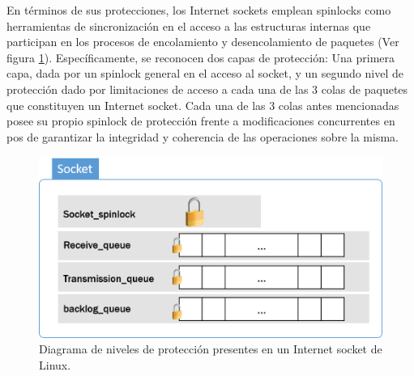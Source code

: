 En términos de sus protecciones, los Internet sockets emplean spinlocks como herramientas de sincronización en el acceso a las estructuras internas que participan en los procesos de encolamiento y desencolamiento de paquetes (Ver figura \ref{fig:socketAnathomy2}). Específicamente, se reconocen dos capas de protección: Una primera capa, dada por un spinlock general en el acceso al socket, y un segundo nivel de protección dado por limitaciones de acceso a cada una de las 3 colas de paquetes que constituyen un Internet socket. Cada una de las 3 colas antes mencionadas posee su propio spinlock de protección frente a modificaciones concurrentes en pos de garantizar la integridad y coherencia de las operaciones sobre la misma.

\begin{figure}[!h]
	\centering
	\includegraphics[scale=0.6]{imagenes/spinlocksSocket.png}
	\caption{Diagrama de niveles de protección presentes en un Internet socket de Linux.}
	\label{fig:socketAnathomy2}
\end{figure}

